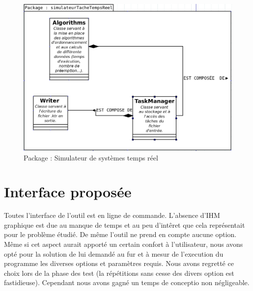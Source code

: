    \begin{figure}[htbp]
  \centering
  \includegraphics[scale=0.55]{img/packsstr}
  \caption{Package : Simulateur de systèmes temps réel}
  \label{fig:sstr}
\end{figure}
\section{Interface proposée}
Toutes l'interface de l'outil est en ligne de commande. L'absence d'IHM graphique est due au manque de temps et au peu d'intêret que cela représentait pour le problème étudié. De même l'outil ne prend en compte aucune option. Même si cet aspect aurait apporté un certain confort à l'utilisateur, nous avons opté pour la solution de lui demandé au fur et à mesur de l'execution du programme les diverses options et paramètres requis. Nous avons regretté ce choix lors de la phase des test (la répétitions sans cesse des divers option est fastidieuse). Cependant nous avons gagné un temps de conceptio non négligeable. 


